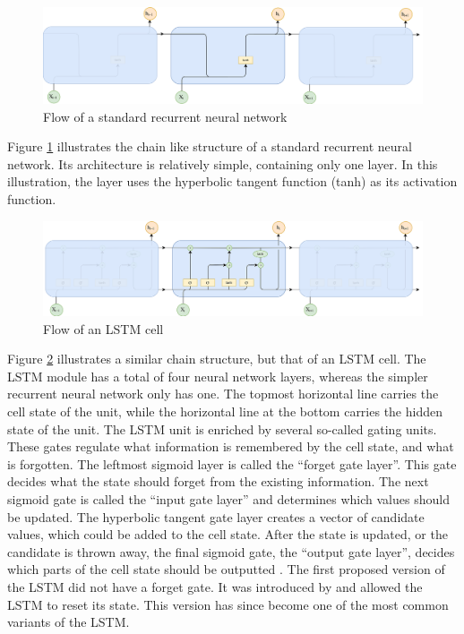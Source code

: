 \begin{figure}[ht]
    \centering
    \includegraphics[width=1\textwidth]{fig/related_work/rnn_flow.png}
    \caption{Flow of a standard recurrent neural network}
    \label{fig:nn-rnn-flow}
\end{figure}

Figure \ref{fig:nn-rnn-flow} illustrates the chain like structure of a standard recurrent neural network. Its architecture is relatively simple, containing only one layer. In this illustration, the layer uses the hyperbolic tangent function (tanh) as its activation function.

\begin{figure}[ht]
    \centering
    \includegraphics[width=1\textwidth]{fig/related_work/lstm_flow.png}
    \caption{Flow of an LSTM cell}
    \label{fig:nn-lstm-flow}
\end{figure}

Figure \ref{fig:nn-lstm-flow} illustrates a similar chain structure, but that of an LSTM cell. The LSTM module has a total of four neural network layers, whereas the simpler recurrent neural network only has one. The topmost horizontal line carries the cell state of the unit, while the horizontal line at the bottom carries the hidden state of the unit. The LSTM unit is enriched by several so-called gating units. These gates regulate what information is remembered by the cell state, and what is forgotten. The leftmost sigmoid layer is called the ``forget gate layer''. This gate decides what the state should forget from the existing information. The next sigmoid gate is called the ``input gate layer'' and determines which values should be updated. The hyperbolic tangent gate layer creates a vector of candidate values, which could be added to the cell state. After the state is updated, or the candidate is thrown away, the final sigmoid gate, the ``output gate layer'', decides which parts of the cell state should be outputted \citep{hochreiter1997long, goodfellow2016deeplearning, olah2015lstm, gers2002learning}. The first proposed version of the LSTM did not have a forget gate. It was introduced by \cite{gers2000learning} and allowed the LSTM to reset its state. This version has since become one of the most common variants of the LSTM.

